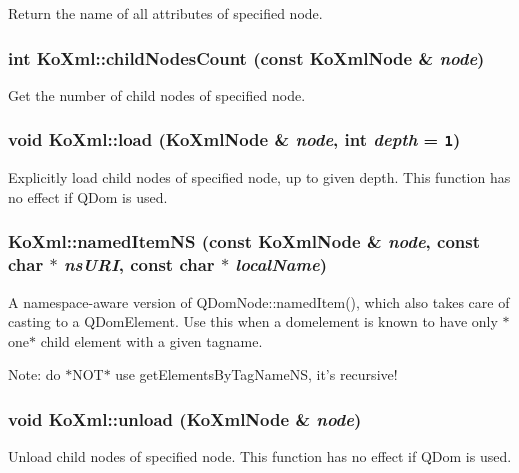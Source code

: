 Return the name of all attributes of specified node. \hypertarget{namespaceKoXml_741654edec9f17c65760b32b45069dcc}{
\subsubsection[{childNodesCount}]{\setlength{\rightskip}{0pt plus 5cm}int KoXml::childNodesCount (const {\bf KoXmlNode} \& {\em node})}}
\label{namespaceKoXml_741654edec9f17c65760b32b45069dcc}


Get the number of child nodes of specified node. \hypertarget{namespaceKoXml_aa2b101e7188f027c484537851115566}{
\subsubsection[{load}]{\setlength{\rightskip}{0pt plus 5cm}void KoXml::load ({\bf KoXmlNode} \& {\em node}, \/  int {\em depth} = {\tt 1})}}
\label{namespaceKoXml_aa2b101e7188f027c484537851115566}


Explicitly load child nodes of specified node, up to given depth. This function has no effect if QDom is used. \hypertarget{namespaceKoXml_f571b501c9481cab08bbcf9b9174e4f5}{
\subsubsection[{namedItemNS}]{ KoXml::namedItemNS (const {\bf KoXmlNode} \& {\em node}, \/  const char $\ast$ {\em nsURI}, \/  const char $\ast$ {\em localName})}}
\label{namespaceKoXml_f571b501c9481cab08bbcf9b9174e4f5}


A namespace-aware version of QDomNode::namedItem(), which also takes care of casting to a QDomElement. Use this when a domelement is known to have only $\ast$one$\ast$ child element with a given tagname.

Note: do $\ast$NOT$\ast$ use getElementsByTagNameNS, it's recursive! \hypertarget{namespaceKoXml_5834f749393cb5393257558484f8d2b9}{
\subsubsection[{unload}]{\setlength{\rightskip}{0pt plus 5cm}void KoXml::unload ({\bf KoXmlNode} \& {\em node})}}
\label{namespaceKoXml_5834f749393cb5393257558484f8d2b9}


Unload child nodes of specified node. This function has no effect if QDom is used. 